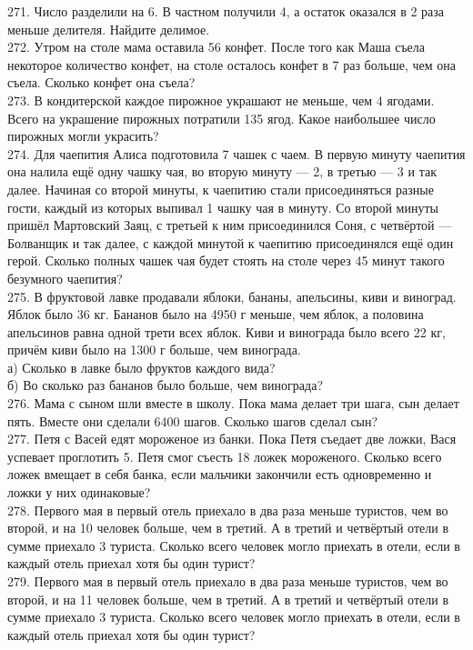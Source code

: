 \documentclass[12pt]{article}
\begin{document}
271. Число разделили на 6. В частном получили 4, а остаток оказался в 2 раза меньше делителя. Найдите делимое.\\
272. Утром на столе мама оставила 56 конфет. После того как Маша съела некоторое количество конфет, на столе осталось конфет в 7 раз больше, чем она съела. Сколько конфет она съела?\\
273. В кондитерской каждое пирожное украшают не меньше, чем 4 ягодами. Всего на украшение пирожных потратили 135 ягод. Какое наибольшее число пирожных могли украсить?\\
274. Для чаепития Алиса подготовила 7 чашек с чаем. В первую минуту чаепития она налила ещё одну чашку чая, во вторую минуту --- 2, в третью --- 3 и так далее. Начиная со второй минуты, к чаепитию стали присоединяться разные гости, каждый из которых выпивал 1 чашку чая в минуту. Со второй минуты пришёл Мартовский Заяц, с третьей к ним присоединился Соня, с четвёртой  --- Болванщик и так далее, с каждой минутой к чаепитию присоединялся ещё один герой. Сколько полных чашек чая будет стоять на столе через 45 минут такого безумного чаепития?\\
275. В фруктовой лавке продавали яблоки, бананы, апельсины, киви и виноград. Яблок было 36 кг. Бананов было на 4950 г меньше, чем яблок, а половина апельсинов равна одной трети всех яблок. Киви и винограда было всего 22 кг, причём киви было на 1300 г больше, чем винограда.\\
а) Сколько в лавке было фруктов каждого вида?\\
б) Во сколько раз бананов было больше, чем винограда?\\
276. Мама с сыном шли вместе в школу. Пока мама делает три шага, сын делает пять. Вместе они сделали 6400 шагов. Сколько шагов сделал сын?\\
277. Петя с Васей едят мороженое из банки. Пока Петя съедает две ложки, Вася успевает проглотить 5. Петя смог съесть 18 ложек мороженого. Сколько всего ложек вмещает в себя банка, если мальчики закончили есть одновременно и ложки у них одинаковые?\\
278. Первого мая в первый отель приехало в два раза меньше туристов, чем во второй, и на 10 человек больше, чем в третий. А в третий и четвёртый отели в сумме приехало 3 туриста. Сколько всего человек могло приехать в отели, если в каждый отель приехал хотя бы один турист?\\
279. Первого мая в первый отель приехало в два раза меньше туристов, чем во второй, и на 11 человек больше, чем в третий. А в третий и четвёртый отели в сумме приехало 3 туриста. Сколько всего человек могло приехать в отели, если в каждый отель приехал хотя бы один турист?\\
\end{document}
